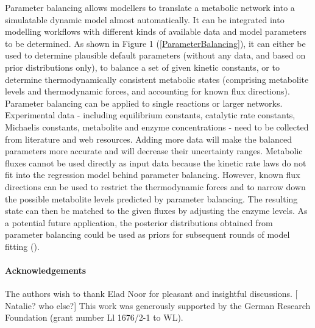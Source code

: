 \documentclass{bioinfo}
\newcommand{\co}[1]{[{\color{red} #1}]}
\begin{document}
Parameter balancing allows modellers to translate a metabolic network
into a simulatable dynamic model almost automatically. It can be
integrated into modelling workflows with different kinds of available
data and model parameters to be determined. As shown in Figure 1
(\ref{ParameterBalancing}), it can either be used to determine
plausible default parameters (without any data, and based on prior
distributions only), to balance a set of given kinetic constants, or
to determine thermodynamically consistent metabolic states (comprising
metabolite levels and thermodynamic forces, and accounting for known
flux directions). Parameter balancing can be applied to single
reactions or larger networks.  Experimental data - including
equilibrium constants, catalytic rate constants, Michaelis constants,
metabolite and enzyme concentrations - need to be collected from
literature and web resources. Adding more data will make the balanced
parameters more accurate and will decrease their uncertainty
ranges. Metabolic fluxes cannot be used directly as input data because
the kinetic rate laws do not fit into the regression model behind
parameter balancing. However, known flux directions can be used to
restrict the thermodynamic forces and to narrow down the possible
metabolite levels predicted by parameter balancing. The resulting
state can then be matched to the given fluxes by adjusting the enzyme
levels.  As a potential future application, the posterior
distributions obtained from parameter balancing could be used as
priors for subsequent rounds of model fitting
(\cite{liebermeister2006bringing}).

\paragraph{Acknowledgements}
The authors wish to thank Elad Noor for pleasant and insightful
discussions. \co{Natalie?  who else?} This work was generously
supported by the German Research Foundation (grant number Ll 1676/2-1
to WL). 
\vspace{-.5cm}

\ \\[-10mm]



\end{document}
